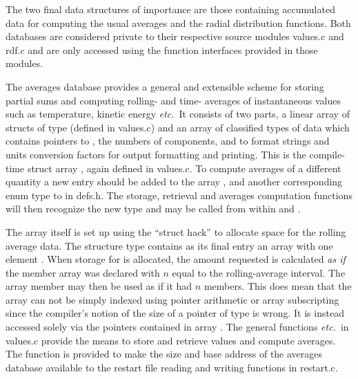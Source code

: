 \documentclass[a4paper,twoside]{report}
\newcommand{\Fname}[1]{{\upshape\mdseries\sffamily#1}}
\newcommand{\etc}{\emph{etc.}}
\begin{document}
The two final data structures of importance are those containing
accumulated data for computing the usual averages and the radial
distribution functions.  Both databases are considered private to
their respective source modules \Fname{values.c} and \Fname{rdf.c}
and are only accessed using the function interfaces provided in those
modules.

The averages database provides a general and extensible scheme for
storing partial sums and computing rolling- and time- averages of
instantaneous values such as temperature, kinetic energy \etc\ It
consists of two parts, a linear array  of structs of type
 (defined in \Fname{values.c}) and an array of classified
types of data which contains pointers to , the numbers of
components, and to format strings and units conversion factors for
output formatting and printing.  This is the compile-time struct array
, again defined in \Fname{values.c}. To compute
averages of a different quantity a new entry should be added to the
array , and another corresponding enum type to  in \Fname{defs.h}.  The storage, retrieval and averages
computation functions will then recognize the new type and may be
called from within  and .

The array  itself is set up using the ``struct hack'' to
allocate space for the rolling average data.  The structure type
 contains as its final entry an array with one element
.  When storage for  is allocated, the
amount requested is calculated \emph{as if} the member array was
declared  with $n$ equal to the rolling-average
interval.  The array member  may then be used as if it
had $n$ members.  This does mean that the array  can not be
simply indexed using pointer arithmetic or array subscripting since
the compiler's notion of the size of a pointer of type
 is wrong.  It is instead accessed solely via the
pointers contained in array .  The general functions
 \etc\ in \Fname{values.c} provide the means to
store and retrieve values and compute averages.  The function
 is provided to make the size and base address of
the averages database available to the restart file reading and
writing functions in \Fname{restart.c}.
\end{document}
